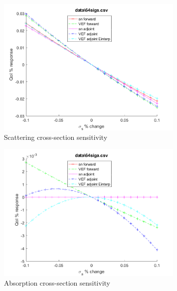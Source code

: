 \documentclass{article}
\begin{document}
\begin{figure}[H]
\begin{subfigure}{.5\textwidth}
  \includegraphics[width=.98\linewidth]{IanProposal/figures2/64sigsSens.png}
  \caption{Scattering cross-section sensitivity}
  \label{fig:sfig2}
\end{subfigure}%
\begin{subfigure}{.5\textwidth}
  \centering
  \includegraphics[width=.98\linewidth]{IanProposal/figures2/64sigaSens.png}
  \caption{Absorption cross-section sensitivity}
  \label{fig:sfig5}
\end{subfigure}%
\caption{}
\label{fig:fig}
\end{figure}
\newpage

\end{document}
